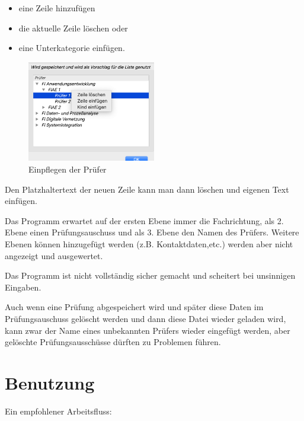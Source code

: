 \documentclass[a4paper,notitlepage,parskip=half]{scrartcl}
\begin{document}
\begin{itemize}
\item eine Zeile hinzufügen
\item die aktuelle Zeile löschen oder
\item eine Unterkategorie einfügen. 
\end{itemize}

\begin{figure}[ht]
  \centering
  \includegraphics[width=0.5\textwidth]{Einstellungen2.png}
  \caption{Einpflegen der Prüfer}
  \label{fig:einstellungen2}
\end{figure}

Den Platzhaltertext der neuen Zeile kann man dann löschen und eigenen Text einfügen.

\begin{marker}
Das Programm erwartet auf der ersten Ebene immer die Fachrichtung, als 2. Ebene einen Prüfungsauschuss und als 3. Ebene den Namen des Prüfers. Weitere Ebenen können hinzugefügt werden (z.B. Kontaktdaten,etc.) werden aber nicht angezeigt und ausgewertet.
\end{marker}

Das Programm ist nicht vollständig sicher gemacht und scheitert bei unsinnigen Eingaben.

Auch wenn eine Prüfung abgespeichert wird und später diese Daten im Prüfungsauschuss gelöscht werden und dann diese Datei wieder geladen wird, kann zwar der Name eines unbekannten Prüfers wieder eingefügt werden, aber gelöschte Prüfungsausschüsse dürften zu Problemen führen.

\section{Benutzung}

Ein empfohlener Arbeitsfluss:
\end{document}

